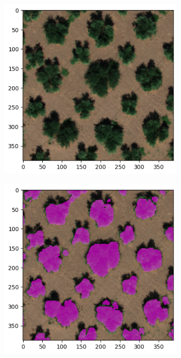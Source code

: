 \documentclass[comsoc,final]{IEEEtran}
\begin{document}
\begin{figure}
{\begin{subfigure}[b]{0.45\columnwidth}
         \caption{}
         \label{maskplot:b}
     \end{subfigure}}\hfill
%       
     \begin{subfigure}[b]{0.45\columnwidth}
         \centering
         \includegraphics[width=\columnwidth]{ulivo}
         \caption{}
         \label{maskplot:c}
     \end{subfigure}%
%
     \begin{subfigure}[b]{0.45\columnwidth}
         \centering
         \includegraphics[width=\columnwidth]{ulivo_GT}

\end{subfigure}
\end{figure}
\end{document}
